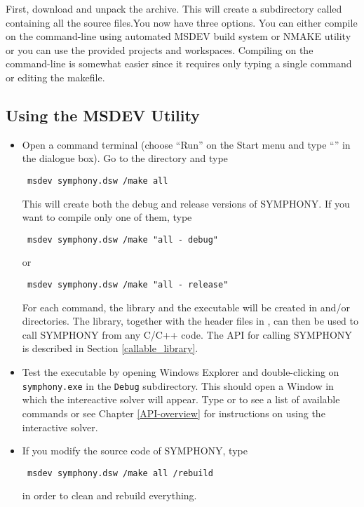 First, download  and unpack the archive. This will
create a subdirectory called  containing all the source
files.You now 
have three options. You can either compile on the command-line using automated 
MSDEV build system or NMAKE utility or you can use the provided projects and 
workspaces. Compiling on the command-line is somewhat easier since it requires 
only typing a single command or editing the makefile. 

\subsection{Using the MSDEV Utility}
\label{using_msdev}
\begin{itemize}
\item Open a command terminal (choose ``Run'' on the Start menu and type
``'' in the dialogue box). Go to the 
directory and type 
{\color{Brown}
\begin{verbatim}
 msdev symphony.dsw /make all
\end{verbatim}
}
This will create both the debug and release versions of SYMPHONY. If you 
want to compile only one of them, type
{\color{Brown}
\begin{verbatim}
 msdev symphony.dsw /make "all - debug"
\end{verbatim}
}
or 
{\color{Brown}
\begin{verbatim}
 msdev symphony.dsw /make "all - release"
\end{verbatim}
}
For each command, the library  and the executable 
 will be created in  and/or 
directories.  The library, together with the header files in 
, can then be 
used to call SYMPHONY from any C/C++ code. The API for calling SYMPHONY is 
described in Section \ref{callable_library}.

\item Test the executable by opening Windows Explorer and double-clicking
on {\color{Brown}\texttt{symphony.exe}} in the
{\color{Brown}\texttt{Debug\bs}} subdirectory. This should open a Window in
which the intereactive solver will appear. Type  or  to see
a list of available commands or see Chapter
\ref{API-overview} for instructions on using the interactive solver.

\item If you modify the source code of SYMPHONY, type 
{\color{Brown}
\begin{verbatim}
 msdev symphony.dsw /make all /rebuild
\end{verbatim}
}
in order to clean and rebuild everything.
\end{itemize} 

